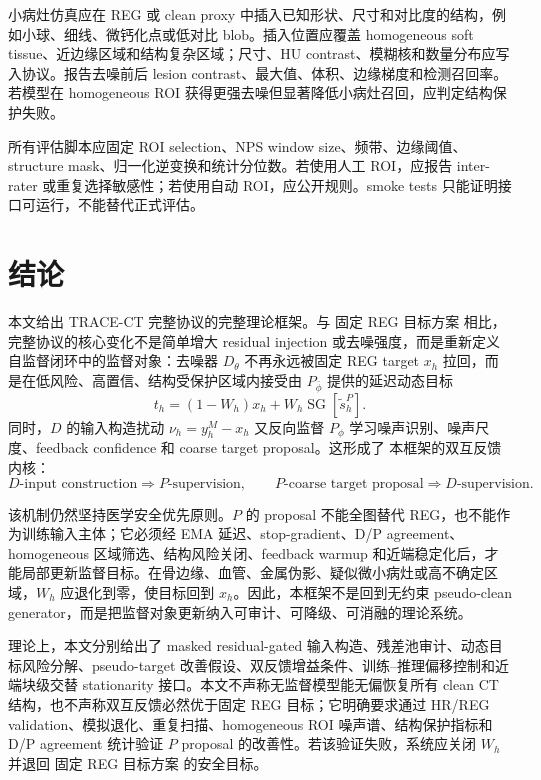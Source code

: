 \documentclass[11pt,a4paper,UTF8,fontset=fandol]{ctexart}
\theoremstyle{definition}
\DeclareMathOperator{\SG}{SG}
\begin{document}
小病灶仿真应在 REG 或 clean proxy 中插入已知形状、尺寸和对比度的结构，例如小球、细线、微钙化点或低对比 blob。插入位置应覆盖 homogeneous soft tissue、近边缘区域和结构复杂区域；尺寸、HU contrast、模糊核和数量分布应写入协议。报告去噪前后 lesion contrast、最大值、体积、边缘梯度和检测召回率。若模型在 homogeneous ROI 获得更强去噪但显著降低小病灶召回，应判定结构保护失败。

所有评估脚本应固定 ROI selection、NPS window size、频带、边缘阈值、structure mask、归一化逆变换和统计分位数。若使用人工 ROI，应报告 inter-rater 或重复选择敏感性；若使用自动 ROI，应公开规则。smoke tests 只能证明接口可运行，不能替代正式评估。

\section{结论}

本文给出 TRACE-CT 完整协议的完整理论框架。与 固定 REG 目标方案 相比，完整协议的核心变化不是简单增大 residual injection 或去噪强度，而是重新定义自监督闭环中的监督对象：去噪器 $D_\theta$ 不再永远被固定 REG target $x_h$ 拉回，而是在低风险、高置信、结构受保护区域内接受由 $P_{\bar\phi}$ 提供的延迟动态目标
\begin{equation}
    t_h=(1-W_h)x_h+W_h\SG[\tilde s_h^P].
\end{equation}
同时，$D$ 的输入构造扰动 $\nu_h=y_h^M-x_h$ 又反向监督 $P_\phi$ 学习噪声识别、噪声尺度、feedback confidence 和 coarse target proposal。这形成了 本框架的双互反馈内核：
\begin{equation}
    D\text{-input construction}\Rightarrow P\text{-supervision},
    \qquad
    P\text{-coarse target proposal}\Rightarrow D\text{-supervision}.
\end{equation}

该机制仍然坚持医学安全优先原则。$P$ 的 proposal 不能全图替代 REG，也不能作为训练输入主体；它必须经 EMA 延迟、stop-gradient、D/P agreement、homogeneous 区域筛选、结构风险关闭、feedback warmup 和近端稳定化后，才能局部更新监督目标。在骨边缘、血管、金属伪影、疑似微小病灶或高不确定区域，$W_h$ 应退化到零，使目标回到 $x_h$。因此，本框架不是回到无约束 pseudo-clean generator，而是把监督对象更新纳入可审计、可降级、可消融的理论系统。

理论上，本文分别给出了 masked residual-gated 输入构造、残差池审计、动态目标风险分解、pseudo-target 改善假设、双反馈增益条件、训练--推理偏移控制和近端块级交替 stationarity 接口。本文不声称无监督模型能无偏恢复所有 clean CT 结构，也不声称双互反馈必然优于固定 REG 目标；它明确要求通过 HR/REG validation、模拟退化、重复扫描、homogeneous ROI 噪声谱、结构保护指标和 D/P agreement 统计验证 $P$ proposal 的改善性。若该验证失败，系统应关闭 $W_h$ 并退回 固定 REG 目标方案 的安全目标。
\end{document}

